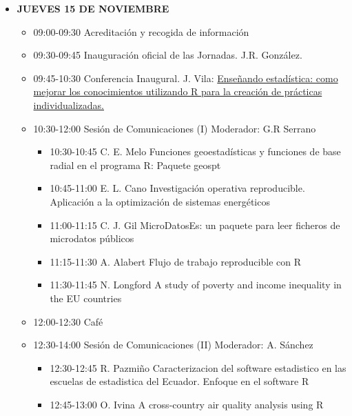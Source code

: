 \begin{itemize}
\item \textsc{\textbf{JUEVES 15 DE NOVIEMBRE}}
  \begin{itemize}

  \item 09:00-09:30 Acreditación y recogida de información

  \item 09:30-09:45 Inauguración oficial de las Jornadas. J.R. González.

  \item 09:45-10:30 Conferencia Inaugural.  J. Vila:
    \href{http://r-es.org/tiki-download_file.php?fileId=484}{Enseñando
      estadística: como mejorar los conocimientos utilizando R
      para la creación de prácticas individualizadas.}
  \item 10:30-12:00 Sesión de Comunicaciones (I) Moderador: G.R
    Serrano
    \begin{itemize}
    \item 10:30-10:45 C. E. Melo Funciones geoestadísticas y
      funciones de base radial en el programa R: Paquete geospt
    \item 10:45-11:00 E. L. Cano Investigación operativa
      reproducible. Aplicación a la optimización de sistemas
      energéticos
    \item 11:00-11:15 C. J. Gil MicroDatosEs: un paquete para leer
      ficheros de microdatos públicos
    \item 11:15-11:30 A. Alabert Flujo de trabajo reproducible con
      R
    \item 11:30-11:45 N. Longford A study of poverty and income
      inequality in the EU countries
    \end{itemize}
  \item 12:00-12:30 Café
 
  \item 12:30-14:00 Sesión de Comunicaciones (II) Moderador:
    A. Sánchez
    \begin{itemize}
    \item 12:30-12:45 R. Pazmiño Caracterizacion del software
      estadistico en las escuelas de estadistica del
      Ecuador. Enfoque en el software R
    \item 12:45-13:00 O. Ivina A cross-country air quality
      analysis using R


\end{itemize}
\end{itemize}
\end{itemize}
